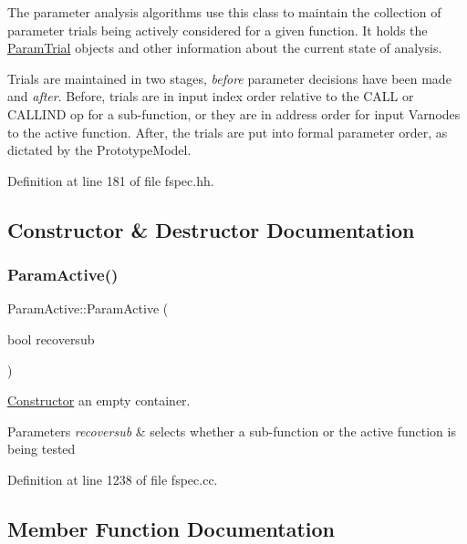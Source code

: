 The parameter analysis algorithms use this class to maintain the collection of parameter trials being actively considered for a given function. It holds the \mbox{\hyperlink{class_param_trial}{Param\+Trial}} objects and other information about the current state of analysis.

Trials are maintained in two stages, {\itshape before} parameter decisions have been made and {\itshape after}. Before, trials are in input index order relative to the C\+A\+LL or C\+A\+L\+L\+I\+ND op for a sub-\/function, or they are in address order for input Varnodes to the active function. After, the trials are put into formal parameter order, as dictated by the Prototype\+Model. 

Definition at line 181 of file fspec.\+hh.



\subsection{Constructor \& Destructor Documentation}
\mbox{\label{class_param_active_aa8913b6e862e54ff8fce9b3c22badc5b}} 
\subsubsection{\texorpdfstring{ParamActive()}{ParamActive()}}
{\footnotesize\ttfamily Param\+Active\+::\+Param\+Active (\begin{DoxyParamCaption}\item[{bool}]{recoversub }\end{DoxyParamCaption})}



\mbox{\hyperlink{class_constructor}{Constructor}} an empty container. 


\begin{DoxyParams}{Parameters}
{\em recoversub} & selects whether a sub-\/function or the active function is being tested \\
\hline
\end{DoxyParams}


Definition at line 1238 of file fspec.\+cc.



\subsection{Member Function Documentation}
\mbox{\label{class_param_active_afadcd4621258a53d5edd7f7d4430eb7b}} 
